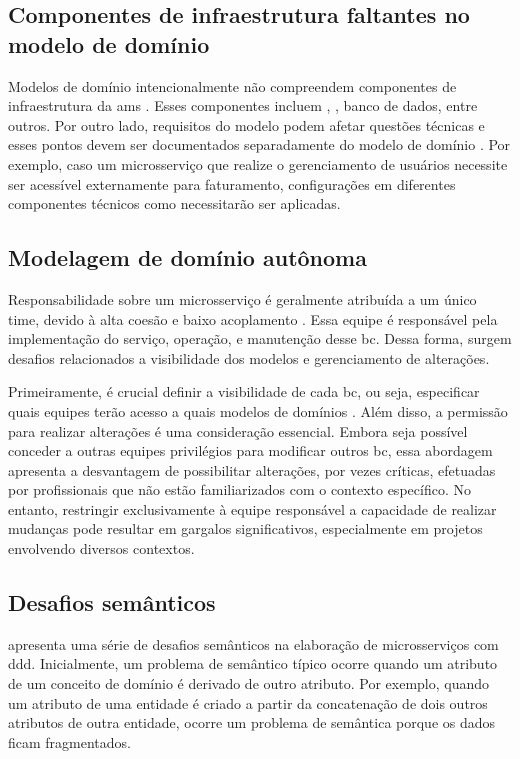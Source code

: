 \subsection{Componentes de infraestrutura faltantes no modelo de domínio}
Modelos de domínio intencionalmente não compreendem componentes de infraestrutura da \acrshort{ams} \cite{Rademacher201836}. Esses componentes incluem , , banco de dados, entre outros. Por outro lado, requisitos do modelo podem afetar questões técnicas e esses pontos devem ser documentados separadamente do modelo de domínio \cite{Rademacher201836}. Por exemplo, caso um microsserviço que realize o gerenciamento de usuários necessite ser acessível externamente para faturamento, configurações em diferentes componentes técnicos como  necessitarão ser aplicadas.

\subsection{Modelagem de domínio autônoma}
Responsabilidade sobre um microsserviço é geralmente atribuída a um único time, devido à alta coesão e baixo acoplamento \cite{Rademacher201836}. Essa equipe é responsável pela implementação do serviço, operação,  e manutenção desse \acrfull{bc}. Dessa forma, surgem desafios relacionados a visibilidade dos modelos e gerenciamento de alterações.

Primeiramente, é crucial definir a visibilidade de cada \acrshort{bc}, ou seja, especificar quais equipes terão acesso a quais modelos de domínios \cite{Rademacher201836}. Além disso, a permissão para realizar alterações é uma consideração essencial. Embora seja possível conceder a outras equipes privilégios para modificar outros \acrshort{bc}, essa abordagem apresenta a desvantagem de possibilitar alterações, por vezes críticas, efetuadas por profissionais que não estão familiarizados com o contexto específico. No entanto, restringir exclusivamente à equipe responsável a capacidade de realizar mudanças pode resultar em gargalos significativos, especialmente em projetos envolvendo diversos contextos.

\subsection{Desafios semânticos}
 apresenta uma série de desafios semânticos na elaboração de microsserviços com \acrshort{ddd}. Inicialmente, um problema de semântico típico ocorre quando um atributo de um conceito de domínio é derivado de outro atributo. Por exemplo, quando um atributo de uma entidade é criado a partir da concatenação de dois outros atributos de outra entidade, ocorre um problema de semântica porque os dados ficam fragmentados.


